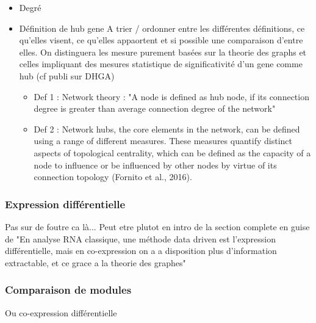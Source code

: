 \begin{itemize}
    \item Degré
    \item Définition de hub gene
    A trier / ordonner entre les différentes définitions, ce qu'elles visent, ce qu'elles appaortent et si possible une comparaison d'entre elles. On distinguera les mesure purement basées sur la theorie des graphs et celles impliquant des mesures statistique de significativité d'un gene comme hub (cf publi sur DHGA)
    \begin{itemize}
        \item Def 1 : Network theory : "A node is defined as hub node, if its connection degree is greater than average connection degree of the network" %
        \item Def 2 : Network hubs, the core elements in the network, can be defined using a range of different measures. These measures quantify distinct aspects of topological centrality, which can be defined as the capacity of a node to influence or be influenced by other nodes by virtue of its connection topology (Fornito et al., 2016).
    \end{itemize}
\end{itemize}
\subsubsection{Expression différentielle}
Pas sur de foutre ca là... Peut etre plutot en intro de la section complete en guise de "En analyse RNA classique, une méthode data driven est l'expression différentielle, mais en co-expression on a a disposition plus d'information extractable, et ce grace a la theorie des graphes" 

\subsubsection{Comparaison de modules}

Ou co-expression différentielle

